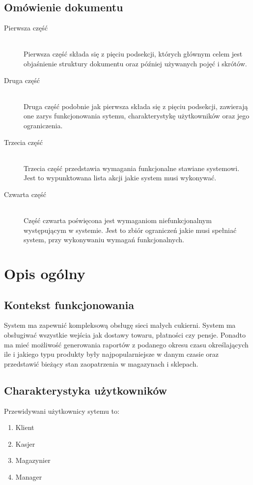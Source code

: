 \documentclass{article}
\begin{document}
\subsection{Omówienie dokumentu}
\begin{description}
    \item [Pierwsza część] \hfill \\
            Pierwsza część składa się z pięciu podsekcji, których głównym celem jest objaśnienie struktury dokumentu oraz później używanych pojęć i skrótów.
    \item [Druga część] \hfill \\
            Druga część podobnie jak pierwsza składa się z pięciu podsekcji, zawierają one zarys funkcjonowania sytemu, charakterystykę użytkowników oraz jego ograniczenia.
    \item [Trzecia część] \hfill \\
            Trzecia część przedstawia wymagania funkcjonalne stawiane systemowi. Jest to wypunktowana lista akcji jakie system musi wykonywać.
    \item [Czwarta część] \hfill \\
            Część czwarta poświęcona jest wymaganiom niefunkcjonalnym występującym w systemie. Jest to zbiór ograniczeń jakie musi spełniać system, przy wykonywaniu wymagań funkcjonalnych.
    \end{description}
\section{Opis ogólny}
\subsection{Kontekst funkcjonowania}
System ma zapewnić kompleksową obsługę sieci małych cukierni.
System ma obsługiwać wszystkie wejścia jak dostawy towaru, płatności czy pensje. 
Ponadto ma mieć możliwość generowania raportów z podanego okresu czasu określających ile i jakiego typu produkty były najpopularniejsze w danym czasie oraz przedstawić bieżący stan zaopatrzenia w magazynach i sklepach. 

\subsection{Charakterystyka użytkowników}
Przewidywani użytkownicy sytemu to:
\begin{enumerate}
\item Klient
\item Kasjer
\item Magazynier
\item Manager 
\end{enumerate}
\end{document}
